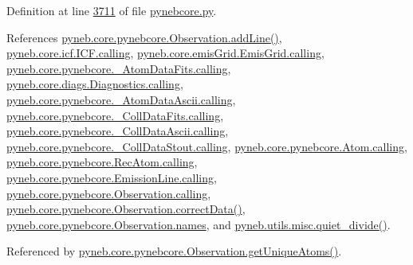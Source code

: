 Definition at line \hyperlink{pynebcore_8py_source_l03711}{3711} of file \hyperlink{pynebcore_8py_source}{pynebcore.\-py}.



References \hyperlink{pynebcore_8py_source_l03558}{pyneb.\-core.\-pynebcore.\-Observation.\-add\-Line()}, \hyperlink{icf_8py_source_l00016}{pyneb.\-core.\-icf.\-I\-C\-F.\-calling}, \hyperlink{emis_grid_8py_source_l00044}{pyneb.\-core.\-emis\-Grid.\-Emis\-Grid.\-calling}, \hyperlink{pynebcore_8py_source_l00097}{pyneb.\-core.\-pynebcore.\-\_\-\-Atom\-Data\-Fits.\-calling}, \hyperlink{diags_8py_source_l00169}{pyneb.\-core.\-diags.\-Diagnostics.\-calling}, \hyperlink{pynebcore_8py_source_l00318}{pyneb.\-core.\-pynebcore.\-\_\-\-Atom\-Data\-Ascii.\-calling}, \hyperlink{pynebcore_8py_source_l00585}{pyneb.\-core.\-pynebcore.\-\_\-\-Coll\-Data\-Fits.\-calling}, \hyperlink{pynebcore_8py_source_l00936}{pyneb.\-core.\-pynebcore.\-\_\-\-Coll\-Data\-Ascii.\-calling}, \hyperlink{pynebcore_8py_source_l01156}{pyneb.\-core.\-pynebcore.\-\_\-\-Coll\-Data\-Stout.\-calling}, \hyperlink{pynebcore_8py_source_l01229}{pyneb.\-core.\-pynebcore.\-Atom.\-calling}, \hyperlink{pynebcore_8py_source_l02643}{pyneb.\-core.\-pynebcore.\-Rec\-Atom.\-calling}, \hyperlink{pynebcore_8py_source_l03385}{pyneb.\-core.\-pynebcore.\-Emission\-Line.\-calling}, \hyperlink{pynebcore_8py_source_l03541}{pyneb.\-core.\-pynebcore.\-Observation.\-calling}, \hyperlink{pynebcore_8py_source_l04028}{pyneb.\-core.\-pynebcore.\-Observation.\-correct\-Data()}, \hyperlink{pynebcore_8py_source_l03543}{pyneb.\-core.\-pynebcore.\-Observation.\-names}, and \hyperlink{misc_8py_source_l00302}{pyneb.\-utils.\-misc.\-quiet\-\_\-divide()}.



Referenced by \hyperlink{pynebcore_8py_source_l03700}{pyneb.\-core.\-pynebcore.\-Observation.\-get\-Unique\-Atoms()}.


